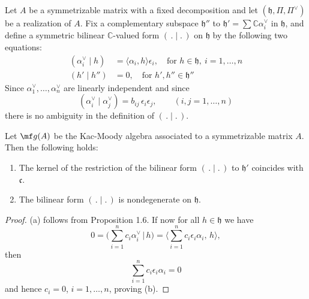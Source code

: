 \documentclass[12pt]{article}
\begin{document}
Let $A$ be a symmetrizable matrix with a fixed decomposition and let $(\mathfrak{h}, \Pi, \Pi^\vee)$ be a realization of $A$. Fix a complementary subspace $\mathfrak{h}''$ to $\mathfrak{h}' = \sum \mathbb{C}\alpha_i^\vee$ in $\mathfrak{h}$, and define a symmetric bilinear $\mathbb{C}$-valued form $(\,.\mid.\,)$ on $\mathfrak{h}$ by the following two equations:
\begin{align}\label{form-on-h}
    (\alpha_i^\vee \mid h) & = \langle \alpha_i, h \rangle \epsilon_i, \quad \text{for } h \in \mathfrak{h},\ i = 1,\ldots,n \\
    (h' \mid h'')          & = 0, \quad \text{for } h', h'' \in \mathfrak{h}''
\end{align}
Since $\alpha_1^\vee, \ldots, \alpha_n^\vee$ are linearly independent and since \begin{equation}
    (\alpha_i^\vee \mid \alpha_j^\vee) = b_{ij}\,\epsilon_i\epsilon_j,
    \qquad (i,j=1,\ldots,n)
\end{equation}
there is no ambiguity in the definition of $(\,.\mid.\,)$.

\begin{lemma}\label{lem:bilinear-form-nondeg}
    Let $\mf g(A)$ be the Kac-Moody algebra associated to a symmetrizable matrix $A$. Then the following holds:
    \begin{enumerate}
        \item The kernel of the restriction of the bilinear form $(\,.\mid.\,)$ to $\mathfrak{h}'$
              coincides with $\mathfrak{c}$.
        \item The bilinear form $(\,.\mid.\,)$ is nondegenerate on $\mathfrak{h}$.
    \end{enumerate}
\end{lemma}

\begin{proof}
    (a) follows from Proposition 1.6.
    If now for all $h \in \mathfrak{h}$ we have
    \[
        0 = \Big(\sum_{i=1}^n c_i \alpha_i^\vee \,\Big|\, h\Big)
        = \Big\langle \sum_{i=1}^n c_i \epsilon_i \alpha_i,\, h \Big\rangle,
    \]
    then
    \[
        \sum_{i=1}^n c_i \epsilon_i \alpha_i = 0
    \]
    and hence $c_i = 0$, $i=1,\ldots,n$, proving (b).
\end{proof}
\end{document}
